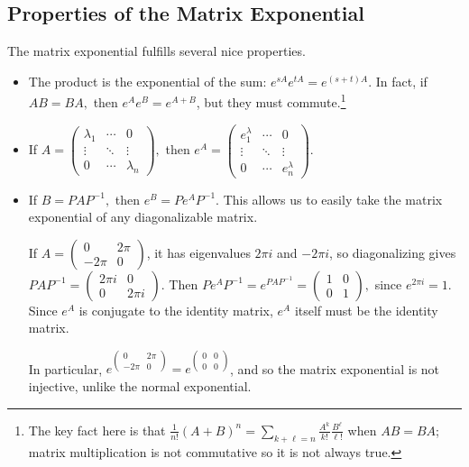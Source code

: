 \subsection{Properties of the Matrix Exponential}
The matrix exponential fulfills several nice properties. 
\begin{itemize}
    \item The product is the exponential of the sum: $e^{sA}e^{tA} = e^{(s + t)A}.$ In fact, if $AB = BA,$ then $e^Ae^B = e^{A + B}$, but they must commute.\footnote{The key fact here is that $\frac{1}{n!}(A + B)^n = \sum_{k + \ell = n} \frac{A^k}{k!} \frac{B^{\ell}}{\ell!}$ when $AB = BA$; matrix multiplication is not commutative so it is not always true.}
    \item If $A = \begin{pmatrix} \lambda_1 & \cdots & 0 \\ \vdots & \ddots & \vdots \\ 0 & \cdots & \lambda_n \end{pmatrix},$ then $e^A = \begin{pmatrix} e^\lambda_1 & \cdots & 0 \\ \vdots & \ddots & \vdots \\ 0 & \cdots & e^\lambda_n \end{pmatrix}.$
    
    \item If $B = PAP^{-1},$ then $e^B = Pe^{A}P^{-1}.$ This allows us to easily take the matrix exponential of any diagonalizable matrix.
    \begin{example}
If $A = \begin{pmatrix} 0 & 2\pi \\ -2\pi & 0 \end{pmatrix}$, it has eigenvalues $2\pi i$ and $-2 \pi i$, so diagonalizing gives $PAP^{-1} = \begin{pmatrix} 2\pi i & 0 \\ 0 & 2\pi i\end{pmatrix}$. Then $Pe^AP^{-1} = e^{PAP^{-1}} = \begin{pmatrix}1 & 0 \\0 & 1 \end{pmatrix},$ since $e^{2\pi i} = 1.$ Since $e^A$ is conjugate to the identity matrix, $e^A$ itself must be the identity matrix. 
\end{example}

In particular, $e^{\begin{pmatrix} 0 & 2\pi \\ -2\pi & 0 \end{pmatrix}} = e^{\begin{pmatrix} 0 & 0 \\ 0& 0 \end{pmatrix} }$, and so the matrix exponential is not injective, unlike the normal exponential.


\end{itemize}
